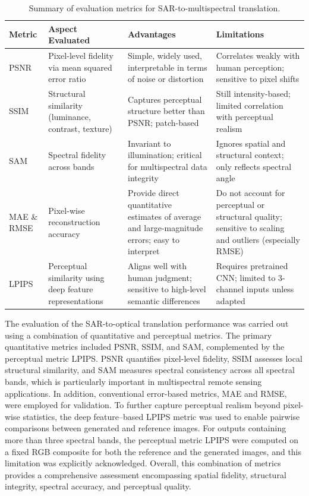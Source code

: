 \renewcommand{\arraystretch}{1.25} %
\begin{table}[h!]
	\centering
	\caption[Evaluation metrics used summary]{Summary of evaluation metrics for SAR-to-multispectral translation.}
	\begin{tabularx}{\textwidth}{p{1.7cm}X X X}
		\toprule
		\textbf{Metric} & \textbf{Aspect Evaluated} & \textbf{Advantages} & \textbf{Limitations} \\
		\midrule
		PSNR  & Pixel-level fidelity via mean squared error ratio & Simple, widely used, interpretable in terms of noise or distortion & Correlates weakly with human perception; sensitive to pixel shifts \\
		SSIM  & Structural similarity (luminance, contrast, texture) & Captures perceptual structure better than PSNR; patch-based & Still intensity-based; limited correlation with perceptual realism \\
		SAM   & Spectral fidelity across bands & Invariant to illumination; critical for multispectral data integrity & Ignores spatial and structural context; only reflects spectral angle \\
		MAE \& RMSE & Pixel-wise reconstruction accuracy & Provide direct quantitative estimates of average and large-magnitude errors; easy to interpret & Do not account for perceptual or structural quality; sensitive to scaling and outliers (especially RMSE) \\
		LPIPS & Perceptual similarity using deep feature representations & Aligns well with human judgment; sensitive to high-level semantic differences & Requires pretrained CNN; limited to 3-channel inputs unless adapted \\
		\bottomrule
	\end{tabularx}
\end{table}
\renewcommand{\arraystretch}{1.0} %


\bigskip
\noindent
The evaluation of the SAR-to-optical translation performance was carried out using a combination of quantitative and perceptual metrics. The primary quantitative metrics included PSNR, SSIM, and SAM, complemented by the perceptual metric LPIPS. PSNR quantifies pixel-level fidelity, SSIM assesses local structural similarity, and SAM measures spectral consistency across all spectral bands, which is particularly important in multispectral remote sensing applications. In addition, conventional error-based metrics, MAE and RMSE, were employed for validation. To further capture perceptual realism beyond pixel-wise statistics, the deep feature–based LPIPS metric was used to enable pairwise comparisons between generated and reference images. For outputs containing more than three spectral bands, the perceptual metric LPIPS were computed on a fixed RGB composite for both the reference and the generated images, and this limitation was explicitly acknowledged. Overall, this combination of metrics provides a comprehensive assessment encompassing spatial fidelity, structural integrity, spectral accuracy, and perceptual quality.
